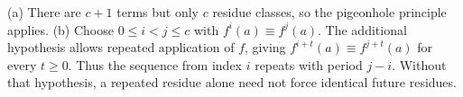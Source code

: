 (a) There are $c+1$ terms but only $c$ residue classes, so the pigeonhole principle applies. (b) Choose $0\le i<j\le c$ with $f^i(a)\equiv f^j(a)$. The additional hypothesis allows repeated application of $f$, giving $f^{i+t}(a)\equiv f^{j+t}(a)$ for every $t\ge0$. Thus the sequence from index $i$ repeats with period $j-i$. Without that hypothesis, a repeated residue alone need not force identical future residues.
